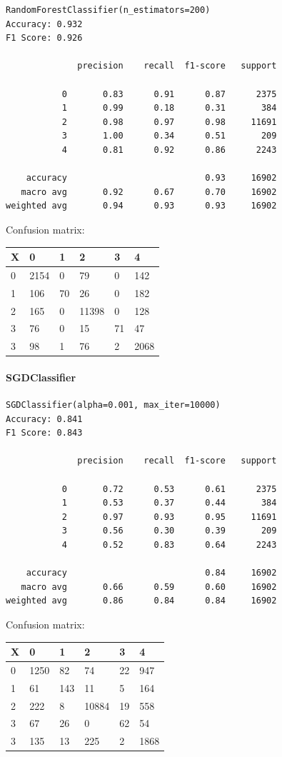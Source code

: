 \documentclass[
]{article}
\begin{document}
\begin{verbatim}
RandomForestClassifier(n_estimators=200)
Accuracy: 0.932
F1 Score: 0.926

              precision    recall  f1-score   support

           0       0.83      0.91      0.87      2375
           1       0.99      0.18      0.31       384
           2       0.98      0.97      0.98     11691
           3       1.00      0.34      0.51       209
           4       0.81      0.92      0.86      2243

    accuracy                           0.93     16902
   macro avg       0.92      0.67      0.70     16902
weighted avg       0.94      0.93      0.93     16902
\end{verbatim}

Confusion matrix:

\begin{longtable}[]{@{}llllll@{}}
\toprule
X & 0 & 1 & 2 & 3 & 4\tabularnewline
\midrule
\endhead
0 & 2154 & 0 & 79 & 0 & 142\tabularnewline
1 & 106 & 70 & 26 & 0 & 182\tabularnewline
2 & 165 & 0 & 11398 & 0 & 128\tabularnewline
3 & 76 & 0 & 15 & 71 & 47\tabularnewline
3 & 98 & 1 & 76 & 2 & 2068\tabularnewline
\bottomrule
\end{longtable}

\hypertarget{sgdclassifier}{%
\paragraph{SGDClassifier}\label{sgdclassifier}}

\begin{verbatim}
SGDClassifier(alpha=0.001, max_iter=10000)
Accuracy: 0.841
F1 Score: 0.843

              precision    recall  f1-score   support

           0       0.72      0.53      0.61      2375
           1       0.53      0.37      0.44       384
           2       0.97      0.93      0.95     11691
           3       0.56      0.30      0.39       209
           4       0.52      0.83      0.64      2243

    accuracy                           0.84     16902
   macro avg       0.66      0.59      0.60     16902
weighted avg       0.86      0.84      0.84     16902
\end{verbatim}

Confusion matrix:

\begin{longtable}[]{@{}llllll@{}}
\toprule
X & 0 & 1 & 2 & 3 & 4\tabularnewline
\midrule
\endhead
0 & 1250 & 82 & 74 & 22 & 947\tabularnewline
1 & 61 & 143 & 11 & 5 & 164\tabularnewline
2 & 222 & 8 & 10884 & 19 & 558\tabularnewline
3 & 67 & 26 & 0 & 62 & 54\tabularnewline
3 & 135 & 13 & 225 & 2 & 1868\tabularnewline
\bottomrule
\end{longtable}
\end{document}

